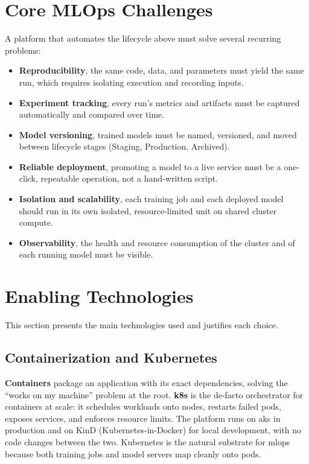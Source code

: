 
\section{Core MLOps Challenges}
\label{sec:mlops-challenges}
A platform that automates the lifecycle above must solve several recurring
problems:

\begin{itemize}[leftmargin=1.4em]
  \item \textbf{Reproducibility}, the same code, data, and parameters must
        yield the same run, which requires isolating execution and recording
        inputs.
  \item \textbf{Experiment tracking}, every run's metrics and artifacts must be
        captured automatically and compared over time.
  \item \textbf{Model versioning}, trained models must be named, versioned, and
        moved between lifecycle stages (Staging, Production, Archived).
  \item \textbf{Reliable deployment}, promoting a model to a live service must
        be a one-click, repeatable operation, not a hand-written script.
  \item \textbf{Isolation and scalability}, each training job and each deployed
        model should run in its own isolated, resource-limited unit on shared
        cluster compute.
  \item \textbf{Observability}, the health and resource consumption of the
        cluster and of each running model must be visible.
\end{itemize}

\section{Enabling Technologies}
\label{sec:technologies}
This section presents the main technologies used and justifies each choice.

\subsection{Containerization and Kubernetes}
\textbf{Containers} package an application with its exact dependencies, solving the
``works on my machine'' problem at the root. \textbf{\gls{k8s}} is the de-facto
orchestrator for containers at scale: it schedules workloads onto nodes, restarts
failed pods, exposes services, and enforces resource limits. The platform runs on
\gls{aks} in production and on KinD (Kubernetes-in-Docker) for local development,
with no code changes between the two. Kubernetes is the natural substrate for
\gls{mlops} because both training jobs and model servers map cleanly onto pods.

